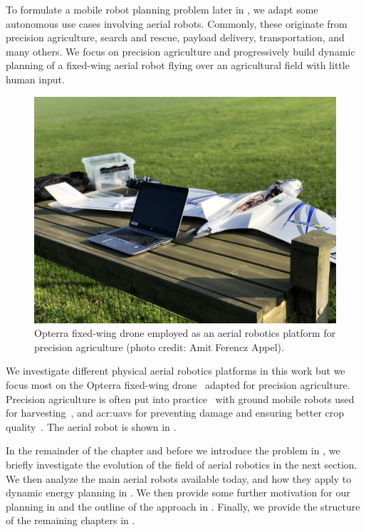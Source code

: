 To formulate a mobile robot planning problem later in , we adapt some autonomous use cases involving aerial robots. Commonly, these originate from precision agriculture, search and rescue, payload delivery, transportation, and many others. We focus on precision agriculture and progressively build dynamic planning of a fixed-wing aerial robot flying over an agricultural field with little human input.

\begin{figure}[t]
  \centering
  \includegraphics[width=.7\textwidth]{pictures/photo}
  \caption[Opterra fixed-wing drone]{Opterra fixed-wing drone employed as an aerial robotics platform for precision agriculture {\scriptsize(photo credit: Amit Ferencz Appel)}.}   
  \label{fig:opterra}
\end{figure}

We investigate different physical aerial robotics platforms in this work but we focus most on the Opterra fixed-wing drone~\citep{opterra} adapted for precision agriculture. Precision agriculture is often put into practice~\citep{hajjaj2014review} with ground mobile robots used for harvesting~\citep{qingchun2012study,dong2011development, de2011design, aljanobi2010setup, li2008analysis, edan2000robotic}, and \Gls{acr:uav}s for preventing damage and ensuring better crop quality~\citep{puri2017agriculture, daponte2019review}. The aerial robot is shown in .

In the remainder of the chapter and before we introduce the problem in , we briefly investigate the evolution of the field of aerial robotics in the next section. We then analyze the main aerial robots available today, and how they apply to dynamic energy planning in . We then provide some further motivation for our planning in  and the outline of the approach in . Finally, we provide the structure of the remaining chapters in .

